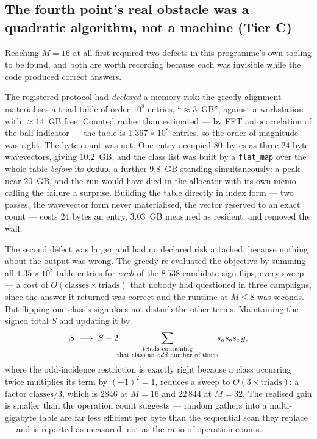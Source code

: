 \documentclass[11pt,a4paper]{article}
\newcommand{\tC}{\textcolor{TierC}{\textbf{Tier C}}}
\theoremstyle{definition}
\theoremstyle{plain}
\begin{document}
\subsection{The fourth point's real obstacle was a quadratic algorithm, not a machine (\tC{})}
\label{sec:algo}

Reaching $M=16$ at all first required two defects in this programme's own tooling to be found,
and both are worth recording because each was invisible while the code produced correct answers.

The registered protocol had \emph{declared} a memory risk: the greedy alignment materialises a
triad table of order $10^8$ entries, ``$\approx 3$~GB'', against a workstation with $\approx
14$~GB free. Counted rather than estimated --- by FFT autocorrelation of the ball indicator ---
the table is $1.367\times10^8$ entries, so the order of magnitude was right. The byte count was
not. One entry occupied $80$~bytes as three $24$-byte wavevectors, giving $10.2$~GB, and the
class list was built by a \texttt{flat\_map} over the whole table \emph{before} its
\texttt{dedup}, a further $9.8$~GB standing simultaneously: a peak near $20$~GB, and the run
would have died in the allocator with its own memo calling the failure a surprise. Building the
table directly in index form --- two passes, the wavevector form never materialised, the vector
reserved to an exact count --- costs $24$ bytes an entry, $3.03$~GB measured as resident, and
removed the wall.

The second defect was larger and had no declared risk attached, because nothing about the
output was wrong. The greedy re-evaluated the objective by summing all $1.35\times10^8$ table
entries for \emph{each} of the $8\,538$ candidate sign flips, every sweep --- a cost of
$O(\text{classes}\times\text{triads})$ that nobody had questioned in three campaigns, since the
answer it returned was correct and the runtime at $M\le 8$ was seconds. But flipping one class's
sign does not disturb the other terms. Maintaining the signed total $S$ and updating it by
\[
  S \;\longmapsto\; S - 2\!\!\sum_{\substack{\text{triads containing}\\ \text{that class an \emph{odd} number of times}}}\!\! s_a s_b s_c\, g ,
\]
where the odd-incidence restriction is exactly right because a class occurring twice multiplies
its term by $(-1)^2=1$, reduces a sweep to $O(3\times\text{triads})$: a factor
$\text{classes}/3$, which is $2846$ at $M=16$ and $22\,844$ at $M=32$. The realised gain is
smaller than the operation count suggests --- random gathers into a multi-gigabyte table are far
less efficient per byte than the sequential scan they replace --- and is reported as measured,
not as the ratio of operation counts.
\end{document}
